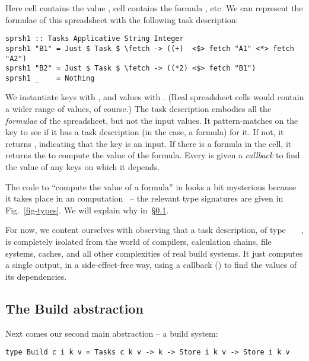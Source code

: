 \noindent
Here cell  contains the value , cell  contains
the formula , etc. We can represent the formulae of this spreadsheet
with the following task description:

\vspace{1mm}
\begin{verbatim}
sprsh1 :: Tasks Applicative String Integer
sprsh1 "B1" = Just $ Task $ \fetch -> ((+)  <$> fetch "A1" <*> fetch "A2")
sprsh1 "B2" = Just $ Task $ \fetch -> ((*2) <$> fetch "B1")
sprsh1 _    = Nothing
\end{verbatim}
\vspace{1mm}

\noindent
We instantiate keys  with , and values  with .
(Real spreadsheet cells would contain a wider range of values, of course.) The
task description  embodies all the \emph{formulae} of the spreadsheet,
but not the input values. It pattern-matches on the key to see if it has a task
description (in the \Excel case, a formula) for it. If not, it returns
, indicating that the key is an input. If there is a formula in the
cell, it returns the  to compute the value of the formula. Every
 is given a \emph{callback}  to find the value of any keys on
which it depends.

The code to ``compute the value of a formula'' in  looks a bit
mysterious because it takes place in an 
computation~\cite{mcbride2008applicative} -- the relevant type signatures are
given in Fig.~\ref{fig-types}. We will explain why in~\S\ref{sec-general-build}.

For now, we content ourselves with observing that a task description, of type
~~~, is completely isolated from the world of
compilers, calculation chains, file systems, caches, and all other
complexities of real build systems.  It just computes a single output, in
a side-effect-free way, using a callback () to find the values
of its dependencies.

\subsection{The Build abstraction}\label{sec-general-build}

Next comes our second main abstraction -- a build system:

\vspace{1mm}
\begin{verbatim}
type Build c i k v = Tasks c k v -> k -> Store i k v -> Store i k v
\end{verbatim}
\vspace{1mm}

